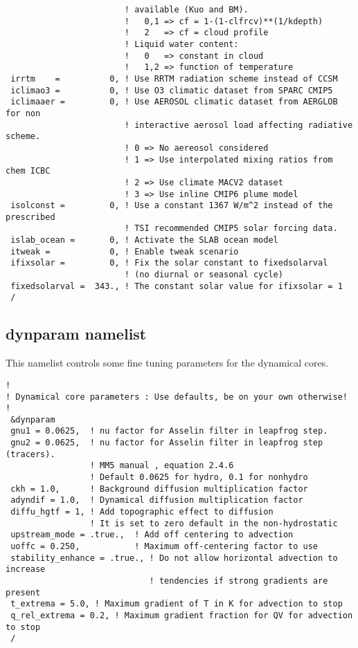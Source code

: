 {\begin{Verbatim}
                        ! available (Kuo and BM).
                        !   0,1 => cf = 1-(1-clfrcv)**(1/kdepth)
                        !   2   => cf = cloud profile
                        ! Liquid water content:
                        !   0   => constant in cloud
                        !   1,2 => function of temperature
 irrtm    =          0, ! Use RRTM radiation scheme instead of CCSM
 iclimao3 =          0, ! Use O3 climatic dataset from SPARC CMIP5
 iclimaaer =         0, ! Use AEROSOL climatic dataset from AERGLOB for non
                        ! interactive aerosol load affecting radiative scheme.
                        ! 0 => No aereosol considered
                        ! 1 => Use interpolated mixing ratios from chem ICBC
                        ! 2 => Use climate MACV2 dataset
                        ! 3 => Use inline CMIP6 plume model
 isolconst =         0, ! Use a constant 1367 W/m^2 instead of the prescribed
                        ! TSI recommended CMIP5 solar forcing data.
 islab_ocean =       0, ! Activate the SLAB ocean model
 itweak =            0, ! Enable tweak scenario
 ifixsolar =         0, ! Fix the solar constant to fixedsolarval
                        ! (no diurnal or seasonal cycle)
 fixedsolarval =  343., ! The constant solar value for ifixsolar = 1
 /
\end{Verbatim}
}

\subsection{dynparam namelist}
\label{dynparam}

This namelist controls some fine tuning parameters for the dynamical cores.

{\footnotesize
\begin{Verbatim}
!
! Dynamical core parameters : Use defaults, be on your own otherwise!
!
 &dynparam
 gnu1 = 0.0625,  ! nu factor for Asselin filter in leapfrog step.
 gnu2 = 0.0625,  ! nu factor for Asselin filter in leapfrog step (tracers).
                 ! MM5 manual , equation 2.4.6
                 ! Default 0.0625 for hydro, 0.1 for nonhydro
 ckh = 1.0,      ! Background diffusion multiplication factor
 adyndif = 1.0,  ! Dynamical diffusion multiplication factor
 diffu_hgtf = 1, ! Add topographic effect to diffusion
                 ! It is set to zero default in the non-hydrostatic
 upstream_mode = .true.,  ! Add off centering to advection
 uoffc = 0.250,           ! Maximum off-centering factor to use
 stability_enhance = .true., ! Do not allow horizontal advection to increase
                             ! tendencies if strong gradients are present
 t_extrema = 5.0, ! Maximum gradient of T in K for advection to stop
 q_rel_extrema = 0.2, ! Maximum gradient fraction for QV for advection to stop
 /
\end{Verbatim}
}

